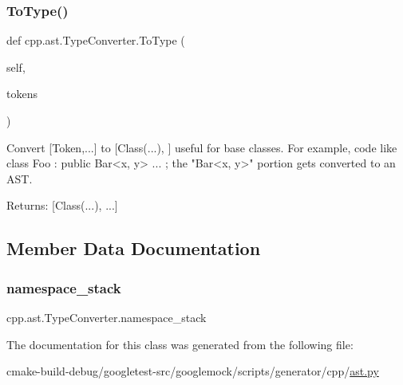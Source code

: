 \subsubsection{\texorpdfstring{ToType()}{ToType()}}
{\footnotesize\ttfamily def cpp.\+ast.\+Type\+Converter.\+To\+Type (\begin{DoxyParamCaption}\item[{}]{self,  }\item[{}]{tokens }\end{DoxyParamCaption})}

\begin{DoxyVerb}Convert [Token,...] to [Class(...), ] useful for base classes.
For example, code like class Foo : public Bar<x, y> { ... };
the "Bar<x, y>" portion gets converted to an AST.

Returns:
  [Class(...), ...]
\end{DoxyVerb}
 

\subsection{Member Data Documentation}
\mbox{\label{classcpp_1_1ast_1_1TypeConverter_abb739f15c6cd0800e07c086c2b30833e}} 
\subsubsection{\texorpdfstring{namespace\_stack}{namespace\_stack}}
{\footnotesize\ttfamily cpp.\+ast.\+Type\+Converter.\+namespace\+\_\+stack}



The documentation for this class was generated from the following file\+:\begin{DoxyCompactItemize}
\item 
cmake-\/build-\/debug/googletest-\/src/googlemock/scripts/generator/cpp/\mbox{\hyperlink{ast_8py}{ast.\+py}}\end{DoxyCompactItemize}
